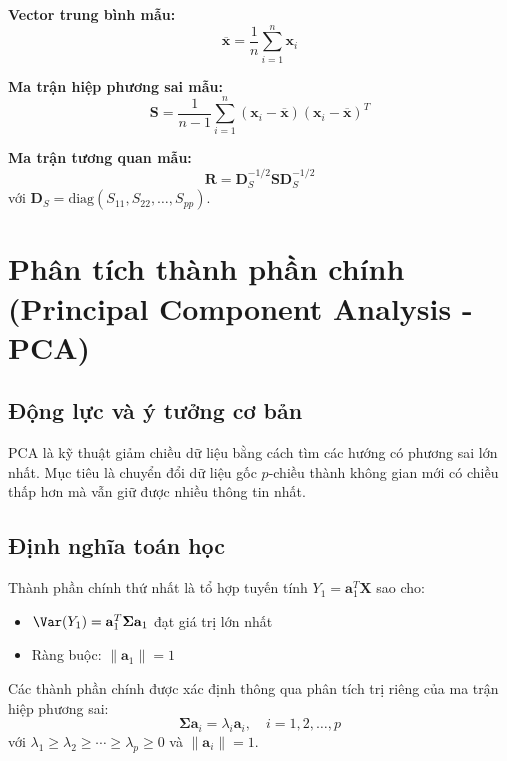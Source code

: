 \textbf{Vector trung bình mẫu:}
\[
\overline{\mathbf{x}} = \frac{1}{n}\sum_{i=1}^n \mathbf{x}_i
\]

\textbf{Ma trận hiệp phương sai mẫu:}
\[
\mathbf{S} = \frac{1}{n-1}\sum_{i=1}^n (\mathbf{x}_i - \overline{\mathbf{x}})(\mathbf{x}_i - \overline{\mathbf{x}})^T
\]

\textbf{Ma trận tương quan mẫu:}
\[
\mathbf{R} = \mathbf{D}_S^{-1/2} \mathbf{S} \mathbf{D}_S^{-1/2}
\]
với $\mathbf{D}_S = \text{diag}(S_{11}, S_{22}, \ldots, S_{pp})$.

\section{Phân tích thành phần chính (Principal Component Analysis - PCA)}

\subsection{Động lực và ý tưởng cơ bản}
PCA là kỹ thuật giảm chiều dữ liệu bằng cách tìm các hướng có phương sai lớn nhất. Mục tiêu là chuyển đổi dữ liệu gốc $p$-chiều thành không gian mới có chiều thấp hơn mà vẫn giữ được nhiều thông tin nhất.

\subsection{Định nghĩa toán học}
\begin{dn}
Thành phần chính thứ nhất là tổ hợp tuyến tính $Y_1 = \mathbf{a}_1^T\mathbf{X}$ sao cho:
\begin{itemize}
    \item $\Var(Y_1) = \mathbf{a}_1^T\boldsymbol{\Sigma}\mathbf{a}_1$ đạt giá trị lớn nhất
    \item Ràng buộc: $\|\mathbf{a}_1\| = 1$
\end{itemize}
\end{dn}

\begin{dl}
Các thành phần chính được xác định thông qua phân tích trị riêng của ma trận hiệp phương sai:
\[
\boldsymbol{\Sigma}\mathbf{a}_i = \lambda_i\mathbf{a}_i, \quad i = 1, 2, \ldots, p
\]
với $\lambda_1 \geq \lambda_2 \geq \cdots \geq \lambda_p \geq 0$ và $\|\mathbf{a}_i\| = 1$.
\end{dl}

